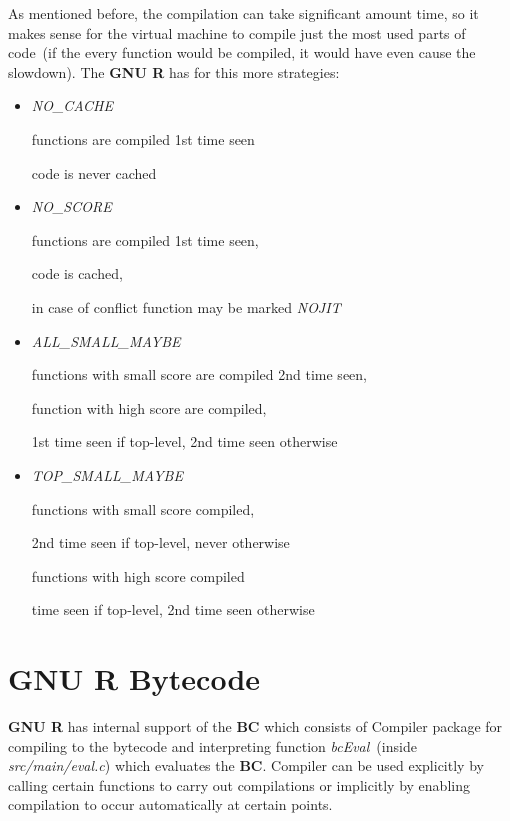\documentclass[thesis=M,english]{FITthesis}[2018/10/20]
\begin{document}
As mentioned before, the compilation can take significant amount time, so it makes sense for the virtual machine to compile just the most used parts of code~(if the every function would be compiled, it would have even cause the slowdown). The \textbf{GNU R} has for this more strategies:

\begin{itemize}
  \item \textit{NO{\_}CACHE}

      functions are compiled 1st time seen

      \hspace*{6mm} code is never cached

  \item \textit{NO{\_}SCORE}

      functions are compiled 1st time seen,

      \hspace*{6mm} code is cached,

      in case of conflict function may be marked \textit{NOJIT}

  \item \textit{ALL{\_}SMALL{\_}MAYBE}

      functions with small score are compiled 2nd time seen,

      function with high score are compiled,

      \hspace*{6mm} 1st time seen if top-level, 2nd time seen otherwise

  \item \textit{TOP{\_}SMALL{\_}MAYBE}

      functions with small score compiled,

      \hspace*{6mm} 2nd time seen if top-level, never otherwise

      functions with high score compiled

      \hspace*{6mm} time seen if top-level, 2nd time seen otherwise
\end{itemize}


\section{GNU R Bytecode}

\textbf{GNU R} has internal support of the \textbf{BC} which consists of Compiler package for compiling to the bytecode and interpreting function \textit{bcEval}~(inside \textit{src/main/eval.c}) which evaluates the \textbf{BC}. Compiler can be used explicitly by calling certain functions to carry out compilations or implicitly by enabling compilation to occur automatically at certain points.
\end{document}
